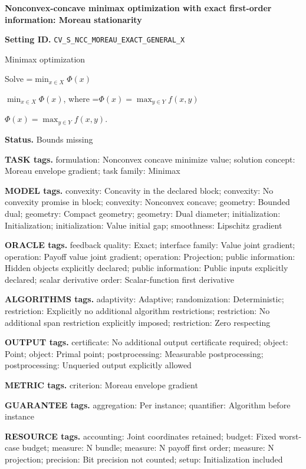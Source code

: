 \documentclass[10pt,a4paper]{article}
\newcommand{\AtlasMath}[1]{\par\begingroup\centering\setbox0=\hbox{$\displaystyle #1$}\ifdim\wd0>1.4\linewidth\typeout{ATLAS WIDE FORMULA: \the\wd0}\fi\ifdim\wd0>\linewidth\resizebox{\linewidth}{!}{\box0}\else\box0\fi\par\endgroup}
\newcommand{\AtlasInlineMath}[1]{\begingroup\setbox0=\hbox{$#1$}\ifdim\wd0>.4\linewidth\endgroup\AtlasMath{#1}\else\endgroup$#1$\fi}
\begin{document}
\raggedright

{\LARGE\bfseries\sffamily\color{AtlasNavy} Nonconvex-concave minimax optimization with exact first-order information: Moreau stationarity\par}\vspace{5pt}
\textbf{Setting ID.} \texttt{CV\_\allowbreak{}S\_\allowbreak{}NCC\_\allowbreak{}MOREAU\_\allowbreak{}EXACT\_\allowbreak{}GENERAL\_\allowbreak{}X}

Minimax optimization

Solve \AtlasInlineMath{\min_{x\in X}\Phi(x)}, where \AtlasInlineMath{\Phi(x)=\max_{y\in Y}f(x,y)}.

\textbf{Status.} Bounds missing

\textbf{TASK tags.} formulation: Nonconvex concave minimize value; solution concept: Moreau envelope gradient; task family: Minimax

\textbf{MODEL tags.} convexity: Concavity in the declared block; convexity: No convexity promise in block; convexity: Nonconvex concave; geometry: Bounded dual; geometry: Compact geometry; geometry: Dual diameter; initialization: Initialization; initialization: Value initial gap; smoothness: Lipschitz gradient

\textbf{ORACLE tags.} feedback quality: Exact; interface family: Value joint gradient; operation: Payoff value joint gradient; operation: Projection; public information: Hidden objects explicitly declared; public information: Public inputs explicitly declared; scalar derivative order: Scalar-function first derivative

\textbf{ALGORITHMS tags.} adaptivity: Adaptive; randomization: Deterministic; restriction: Explicitly no additional algorithm restrictions; restriction: No additional span restriction explicitly imposed; restriction: Zero respecting

\textbf{OUTPUT tags.} certificate: No additional output certificate required; object: Point; object: Primal point; postprocessing: Measurable postprocessing; postprocessing: Unqueried output explicitly allowed

\textbf{METRIC tags.} criterion: Moreau envelope gradient

\textbf{GUARANTEE tags.} aggregation: Per instance; quantifier: Algorithm before instance

\textbf{RESOURCE tags.} accounting: Joint coordinates retained; budget: Fixed worst-case budget; measure: N bundle; measure: N payoff first order; measure: N projection; precision: Bit precision not counted; setup: Initialization included
\end{document}
